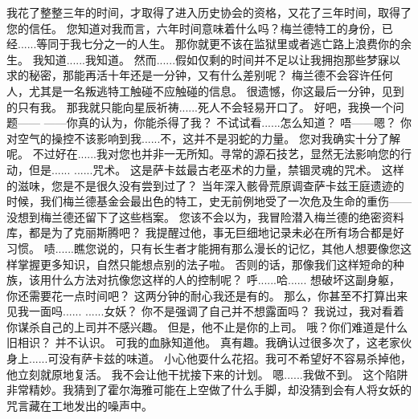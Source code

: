 \documentclass[openany]{book}
\begin{document}
\begin{dialogue}
     我花了整整三年的时间，才取得了进入历史协会的资格，又花了三年时间，取得了您的信任。
     您知道对我而言，六年时间意味着什么吗？梅兰德特工的身份，已经......等同于我七分之一的人生。
     那你就更不该在监狱里或者逃亡路上浪费你的余生。
     我知道......我知道。
     然而......假如仅剩的时间并不足以让我拥抱那些梦寐以求的秘密，那能再活十年还是一分钟，又有什么差别呢？
     梅兰德不会容许任何人，尤其是一名叛逃特工触碰不应触碰的信息。
     很遗憾，你这最后一分钟，见到的只有我。
     那我就只能向星辰祈祷......死人不会轻易开口了。
     好吧，我换一个问题——
     ——你真的认为，你能杀得了我？
     不试试看......怎么知道？
     唔——嗯？
     你对空气的操控不该影响到我......不，这并不是羽蛇的力量。
     您对我确实十分了解呢。
     不过好在......我对您也并非一无所知。寻常的源石技艺，显然无法影响您的行动，但是......
     ......咒术。
     这是萨卡兹最古老巫术的力量，禁锢灵魂的咒术。
     这样的滋味，您是不是很久没有尝到过了？
     当年深入骸骨荒原调查萨卡兹王庭遗迹的时候，我们梅兰德基金会最出色的特工，史无前例地受了一次危及生命的重伤——
     没想到梅兰德还留下了这些档案。
     您该不会以为，我冒险潜入梅兰德的绝密资料库，都是为了克丽斯腾吧？
     我提醒过他，事无巨细地记录未必在所有场合都是好习惯。
     啧......瞧您说的，只有长生者才能拥有那么漫长的记忆，其他人想要像您这样掌握更多知识，自然只能想点别的法子啦。
     否则的话，那像我们这样短命的种族，该用什么方法对抗像您这样的人的控制呢？
     呼......哈......
     想破坏这副身躯，你还需要花一点时间吧？
     这两分钟的耐心我还是有的。
     那么，你甚至不打算出来见我一面吗......
     ......女妖？
     你不是强调了自己并不想露面吗？
     我说过，我对看着你谋杀自己的上司并不感兴趣。
     但是，他不止是你的上司。
     哦？你们难道是什么旧相识？
     并不认识。
     可我的血脉知道他。
     真有趣。我确认过很多次了，这老家伙身上......可没有萨卡兹的味道。
     小心他耍什么花招。我可不希望好不容易杀掉他，他立刻就原地复活。
     我不会让他干扰接下来的计划。
     嗯......我做不到。
     这个陷阱非常精妙。我猜到了霍尔海雅可能在上空做了什么手脚，却没猜到会有人将女妖的咒言藏在工地发出的噪声中。

\end{dialogue}
\end{document}
